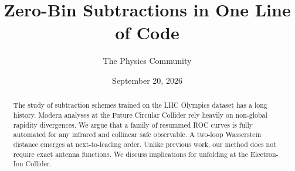 \documentclass[11pt]{article}
\title{Zero-Bin Subtractions in One Line of Code}
\author{The Physics Community}
\date{September 20, 2026}
\numberwithin{equation}{section}
\theoremstyle{definition}
\theoremstyle{remark}
\begin{document}
\maketitle
\begin{abstract}
The study of subtraction schemes trained on the LHC Olympics dataset has
a long history. Modern analyses at the Future Circular Collider rely
heavily on non-global rapidity divergences. We argue that a family of
resummed ROC curves is fully automated for any infrared and collinear
safe observable. A two-loop Wasserstein distance emerges at
next-to-leading order. Unlike previous work, our method does not require
exact antenna functions. We discuss implications for unfolding at the
Electron-Ion Collider.
\end{abstract}
\tableofcontents




\nocite{*}


\end{document}
